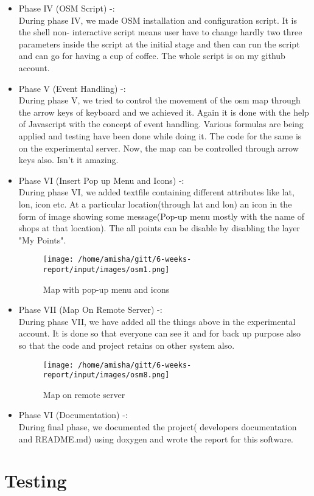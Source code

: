 \begin{itemize}
\item Phase IV (OSM Script) -: \\
        During phase IV, we made OSM installation and configuration script. It is the shell non- interactive script means user have to change hardly two three parameters inside the script at the initial stage and then can run the script and can go for having a cup of coffee. The whole script is on my github account.
\item Phase V (Event Handling) -: \\
During phase V, we tried to control the movement of the osm map through the arrow keys of keyboard and we achieved it. Again it is done with the help of Javascript with the concept of event handling. Various formulas are being applied and testing have been done while doing it. The code for the same is on the experimental server. Now, the map can be controlled through arrow keys also. Isn't it amazing. 
\item Phase VI (Insert Pop up Menu and Icons) -: \\
During phase VI, we added textfile containing different attributes like lat, lon, icon etc. At a particular location(through lat and lon) an icon in the form of image showing some message(Pop-up menu mostly with the name of shops at that location). The all points can be disable by disabling the layer "My Points". 
\begin{figure}[ht]
\centering \texttt{[image: /home/amisha/gitt/6-weeks-report/input/images/osm1.png]}
\caption{Map with pop-up menu and icons}
\end{figure}
\item Phase VII (Map On Remote Server) -: \\
During phase VII, we have added all the things above in the experimental account. It is done so that everyone can see it and for back up purpose also so that the code and project retains on other system also.
\begin{figure}[ht]
\centering \texttt{[image: /home/amisha/gitt/6-weeks-report/input/images/osm8.png]}
\caption{Map on remote server}
\end{figure}
\item Phase VI (Documentation) -: \\
During final phase, we documented the project( developers documentation and README.md)
using doxygen and wrote the report for this software.
\end{itemize}

\section{Testing}

